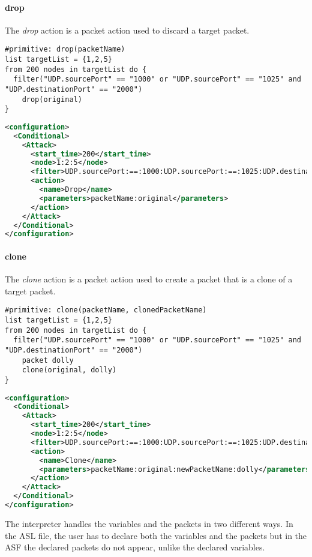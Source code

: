 \paragraph{drop}
The \emph{drop} action is a packet action used to discard a target packet.
%
\begin{lstlisting}[language={asl},caption={ASL drop example}]
#primitive: drop(packetName)
list targetList = {1,2,5}
from 200 nodes in targetList do {
  filter("UDP.sourcePort" == "1000" or "UDP.sourcePort" == "1025" and "UDP.destinationPort" == "2000")
    drop(original)
}
\end{lstlisting}
%
\begin{lstlisting}[language={xml},caption={Interpreter output}]
<configuration>
  <Conditional>
    <Attack>
      <start_time>200</start_time>
      <node>1:2:5</node>
      <filter>UDP.sourcePort:==:1000:UDP.sourcePort:==:1025:UDP.destinationPort:==:2000:AND:OR</filter>
      <action>
        <name>Drop</name>
        <parameters>packetName:original</parameters>
      </action>
    </Attack>
  </Conditional>
</configuration>
\end{lstlisting}

\paragraph{clone}
The \emph{clone} action is a packet action used to create a packet that is a clone of a target packet.
%
\begin{lstlisting}[language={asl},caption={ASL clone example}]
#primitive: clone(packetName, clonedPacketName)
list targetList = {1,2,5}
from 200 nodes in targetList do {
  filter("UDP.sourcePort" == "1000" or "UDP.sourcePort" == "1025" and "UDP.destinationPort" == "2000")
    packet dolly
    clone(original, dolly)
}
\end{lstlisting}
%
\begin{lstlisting}[language={xml},caption={Interpreter output}]
<configuration>
  <Conditional>
    <Attack>
      <start_time>200</start_time>
      <node>1:2:5</node>
      <filter>UDP.sourcePort:==:1000:UDP.sourcePort:==:1025:UDP.destinationPort:==:2000:AND:OR</filter>
      <action>
        <name>Clone</name>          
        <parameters>packetName:original:newPacketName:dolly</parameters>                        
      </action>
    </Attack>
  </Conditional>
</configuration>
\end{lstlisting}
%
The interpreter handles the variables and the packets in two different ways. 
In the ASL file, the user has to declare both the variables and the packets but in the ASF the declared packets do not appear, unlike the declared variables.

